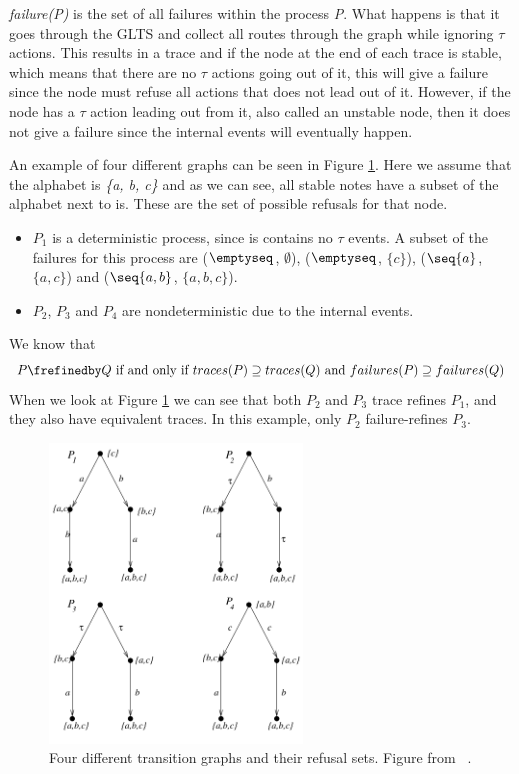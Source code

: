 \textit{failure(P)} is the set of all failures within the process \textit{P}. What happens is that it goes through the GLTS and collect all routes through the graph while ignoring $\tau$ actions. This results in a trace and if the node at the end of each trace is stable, which means that there are no $\tau$ actions going out of it, this will give a failure since the node must refuse all actions that does not lead out of it. However, if the node has a $\tau$ action leading out from it, also called an unstable node, then it does not give a failure since the internal events will eventually happen.

An example of four different graphs can be seen in Figure \ref{fig:failures_graph}. Here we assume that the alphabet is \textit{\{a, b, c\}} and as we can see, all stable notes have a subset of the alphabet next to is. These are the set of possible refusals for that node.
\begin{itemize}
    \item $P_1$ is a deterministic process, since is contains no $\tau$ events. A subset of the failures for this process are ($\emptyseq$, $\emptyset$), ($\emptyseq$, $\{c\}$), ($\seq{a}$, $\{a,c\}$) and ($\seq{a,b}$, $\{a,b,c\}$).
    \item $P_2$, $P_3$ and $P_4$ are nondeterministic due to the internal events.
\end{itemize}
We know that $$P \frefinedby Q \text{ if and only if } traces(P) \supseteq traces(Q) \text{ and } failures(P) \supseteq failures(Q)$$
When we look at Figure \ref{fig:failures_graph} we can see that both $P_2$ and $P_3$ trace refines $P_1$, and they also have equivalent traces. In this example, only $P_2$ failure-refines $P_3$.
\begin{figure}[h]
\centering
\includegraphics[width=0.6\textwidth]{figures/failures_graph.jpg}
\caption{Four different transition graphs and their refusal sets. Figure from ~\cite{Roscoe2010}.}
\label{fig:failures_graph}
\end{figure}
